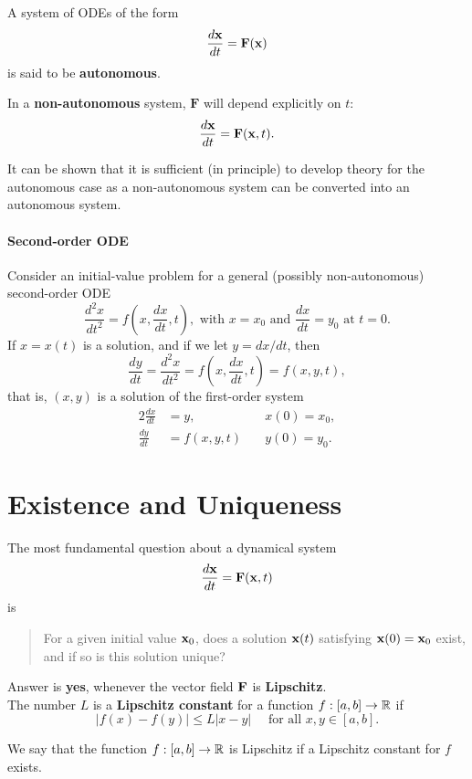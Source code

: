 A system of ODEs of the form
\[\frac{d\mathbf{x}}{dt} = \mathbf{F}(\mathbf{x})\]
is said to be \textbf{autonomous}.

In a \textbf{non-autonomous} system, \(\mathbf{F}\) will depend explicitly on \(t\):
\[\frac{d\mathbf{x}}{dt} = \mathbf{F}(\mathbf{x}, t).\]

It can be shown that it is sufficient (in principle) to develop theory for the autonomous case as a non-autonomous system can be converted into an autonomous system.

\paragraph{Second-order ODE}
Consider an initial-value problem for a general (possibly non-autonomous) second-order ODE
\[\frac{d^2 x}{dt^2} = f\left(x, \frac{dx}{dt}, t \right),  \text{ with } x= x_0  \text{ and } \frac{dx}{dt} = y_0  \text{ at } t= 0.\]
If \(x = x(t)\) is a solution, and if we let \(y = dx/dt\), then
\[\frac{dy}{dt} = \frac{d^2x}{dt^2} = f\left(x, \frac{dx}{dt}, t \right) = f(x, y, t),\]
that is, \((x, y)\) is a solution of the first-order system
\begin{alignat*}{2}
    \frac{dx}{dt} & = y,         & \quad x(0) = x_0, \\
    \frac{dy}{dt} & = f(x, y, t) & \quad y(0) = y_0.
\end{alignat*}


\section{Existence and Uniqueness}
The most fundamental question about a dynamical system
\[\frac{d\mathbf{x}}{dt} = \mathbf{F}(\mathbf{x}, t)\]
is
\begin{quote}
    For a given initial value \(\mathbf{x}_0\), does a solution \(\mathbf{x}(t)\) satisfying \(\mathbf{x}(0) = \mathbf{x}_0\) exist, and if so is this solution unique?
\end{quote}
Answer is \textbf{yes}, whenever the vector field \(\mathbf{F}\) is \textbf{Lipschitz}. \\

The number \(L\) is a \textbf{Lipschitz constant} for a function \(f: [a, b] \to \mathbb{R}\) if
\[|f(x) - f(y)| \leq L|x - y| \quad  \text{ for all } x,y \in [a, b].\]

\bigskip
We say that the function \(f: [a, b] \to \mathbb{R}\) is Lipschitz if a Lipschitz constant for \(f\) exists.

